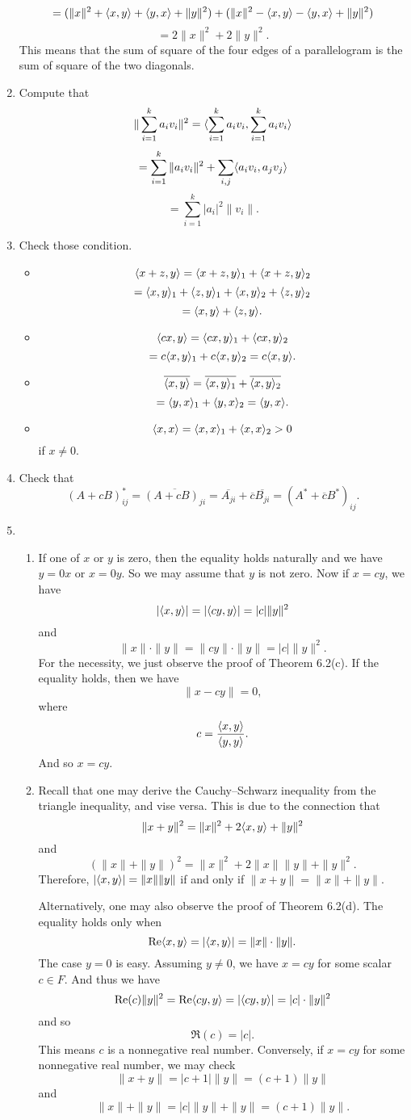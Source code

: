 \begin{enumerate}
\[=(\|x\|^2+\langle x,y\rangle +\langle y,x\rangle +\|y\|^2)+(\|x\|^2-\langle x,y\rangle -\langle y,x\rangle +\|y\|^2)\]
\[=2\|x\|^2+2\|y\|^2.\]
This means that the sum of square of the four edges of a parallelogram is the sum of square of the two diagonals.
\item Compute that 
\[\|\sum_{i=1}^k{a_iv_i}\|^2=\langle \sum_{i=1}^k{a_iv_i}, \sum_{i=1}^k{a_iv_i} \rangle \]
\[=\sum_{i=1}^k{\|a_iv_i\|^2}+\sum_{i,j}\langle a_iv_i,a_jv_j\rangle \]
\[=\sum_{i=1}^k{|a_i|^2\|v_i\|}.\]
\item Check those condition.
\begin{itemize}
\item \[\langle x+z,y\rangle =\langle x+z,y\rangle_1+\langle x+z,y\rangle_2\]
\[=\langle x,y\rangle_1+\langle z,y\rangle_1+\langle x,y\rangle_2+\langle z,y\rangle_2\]
\[=\langle x,y\rangle +\langle z,y\rangle .\]
\item \[\langle cx,y\rangle =\langle cx,y\rangle_1+\langle cx,y\rangle_2\]
\[=c\langle x,y\rangle_1+c\langle x,y\rangle_2=c\langle x,y\rangle .\]
\item \[\overline{\langle x,y\rangle}=\overline{\langle x,y\rangle_1}+\overline{\langle x,y\rangle_2}\]
\[=\langle y,x\rangle_1+\langle y,x\rangle_2=\langle y,x\rangle .\]
\item \[\langle x,x\rangle =\langle x,x\rangle_1+\langle x,x\rangle_2>0\]
if $x\neq 0$.
\end{itemize}
\item Check that 
\[(A+cB)^*_{ij}=\overline{(A+cB)_{ji}}=\overline{A_{ji}}+\overline{c}\overline{B_{ji}}=(A^*+\overline{c}B^*)_{ij}.\]
\item \begin{enumerate}
\item If one of $x$ or $y$ is zero, then the equality holds naturally and we have $y=0x$ or $x=0y$. So we may assume that $y$ is not zero. Now if $x=cy$, we have 
\[|\langle x,y\rangle |=|\langle cy,y\rangle|=|c|\|y\|^2\]
and 
\[\|x\|\cdot \|y\|=\|cy\|\cdot \|y\|=|c|\|y\|^2.\]
For the necessity, we just observe the proof of Theorem 6.2(c). If the equality holds, then we have 
\[\|x-cy\|=0,\]
where 
\[c=\frac{\langle x,y\rangle}{\langle y,y\rangle}.\]
And so $x=cy$.
\item Recall that one may derive the Cauchy--Schwarz inequality from the triangle inequality, and vise versa.  This is due to the connection that 
\[
    \|x + y\|^2 = \|x\|^2 + 2\langle x, y\rangle + \|y\|^2
\]
and  
\[
    (\|x\| + \|y\|)^2 = \|x\|^2 + 2\|x\|\|y\| + \|y\|^2.
\]
Therefore, $|\langle x,y\rangle| = \|x\|\|y\|$ if and only if $\|x + y\| = \|x\| + \|y\|$.  

Alternatively, one may also observe the proof of Theorem 6.2(d). The equality holds only when 
\[\operatorname{Re}\langle x,y\rangle =|\langle x,y\rangle |=\|x\|\cdot \|y\|.\]
The case $y=0$ is easy. Assuming $y\neq 0$, we have $x=cy$ for some scalar $c\in F$. And thus we have
\[\operatorname{Re}(c)\|y\|^2=\operatorname{Re}\langle cy,y\rangle =|\langle cy,y\rangle |=|c|\cdot \|y\|^2\]
and so 
\[\Re(c)=|c|.\]
This means $c$ is a nonnegative real number. Conversely, if $x=cy$ for some nonnegative real number, we may check 
\[\|x+y\|=|c+1|\|y\|=(c+1)\|y\|\]
and 
\[\|x\|+\|y\|=|c|\|y\|+\|y\|=(c+1)\|y\|.\]


\end{enumerate}
\end{enumerate}
